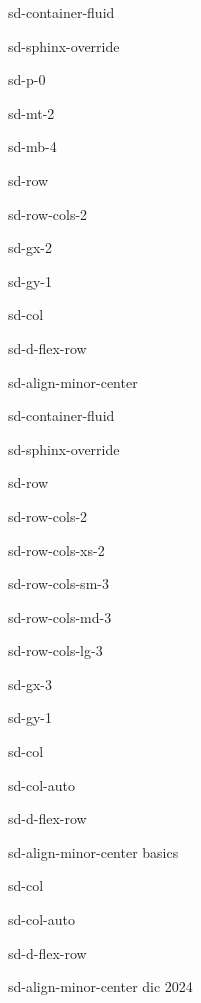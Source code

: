 \documentclass[letterpaper,10pt,italian]{jupyterBook}
\begin{document}
\begin{sphinxuseclass}{sd-container-fluid}
\begin{sphinxuseclass}{sd-sphinx-override}
\begin{sphinxuseclass}{sd-p-0}
\begin{sphinxuseclass}{sd-mt-2}
\begin{sphinxuseclass}{sd-mb-4}
\begin{sphinxuseclass}{sd-row}
\begin{sphinxuseclass}{sd-row-cols-2}
\begin{sphinxuseclass}{sd-gx-2}
\begin{sphinxuseclass}{sd-gy-1}
\begin{sphinxuseclass}{sd-col}
\begin{sphinxuseclass}{sd-d-flex-row}
\begin{sphinxuseclass}{sd-align-minor-center}
\begin{sphinxuseclass}{sd-container-fluid}
\begin{sphinxuseclass}{sd-sphinx-override}
\begin{sphinxuseclass}{sd-row}
\begin{sphinxuseclass}{sd-row-cols-2}
\begin{sphinxuseclass}{sd-row-cols-xs-2}
\begin{sphinxuseclass}{sd-row-cols-sm-3}
\begin{sphinxuseclass}{sd-row-cols-md-3}
\begin{sphinxuseclass}{sd-row-cols-lg-3}
\begin{sphinxuseclass}{sd-gx-3}
\begin{sphinxuseclass}{sd-gy-1}
\begin{sphinxuseclass}{sd-col}
\begin{sphinxuseclass}{sd-col-auto}
\begin{sphinxuseclass}{sd-d-flex-row}
\begin{sphinxuseclass}{sd-align-minor-center}
\sphinxAtStartPar
basics

\end{sphinxuseclass}
\end{sphinxuseclass}
\end{sphinxuseclass}
\end{sphinxuseclass}
\begin{sphinxuseclass}{sd-col}
\begin{sphinxuseclass}{sd-col-auto}
\begin{sphinxuseclass}{sd-d-flex-row}
\begin{sphinxuseclass}{sd-align-minor-center}
 dic 2024


\end{sphinxuseclass}
\end{sphinxuseclass}
\end{sphinxuseclass}
\end{sphinxuseclass}
\end{sphinxuseclass}
\end{sphinxuseclass}
\end{sphinxuseclass}
\end{sphinxuseclass}
\end{sphinxuseclass}
\end{sphinxuseclass}
\end{sphinxuseclass}
\end{sphinxuseclass}
\end{sphinxuseclass}
\end{sphinxuseclass}
\end{sphinxuseclass}
\end{sphinxuseclass}
\end{sphinxuseclass}
\end{sphinxuseclass}
\end{sphinxuseclass}
\end{sphinxuseclass}
\end{sphinxuseclass}
\end{sphinxuseclass}
\end{sphinxuseclass}
\end{sphinxuseclass}
\end{sphinxuseclass}
\end{sphinxuseclass}
\end{document}
